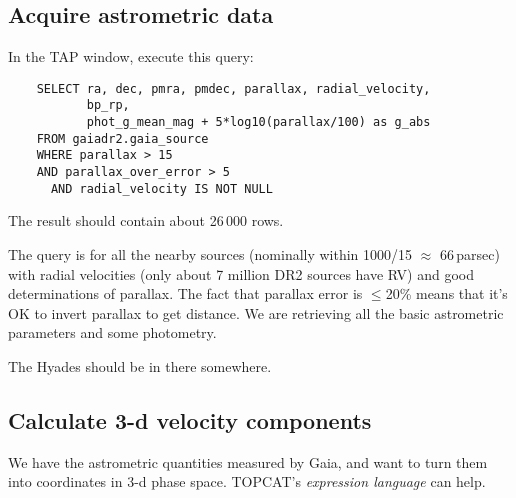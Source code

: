\documentclass{article}
\newcommand{\winfig}[2]
           {\vspace*{-0.5cm}
            \hspace*{0.5cm}\mbox{\vtop{\hbox{\texttt{[image: \#2]}}}}}
\newcommand{\paragap}{\vspace{1.5ex}}
\begin{document}
\begin{minipage}[t]{11cm}
  \subsection{Acquire astrometric data}

  In the TAP window, execute this query:
  \begin{verbatim}
    SELECT ra, dec, pmra, pmdec, parallax, radial_velocity,
           bp_rp,
           phot_g_mean_mag + 5*log10(parallax/100) as g_abs
    FROM gaiadr2.gaia_source
    WHERE parallax > 15
    AND parallax_over_error > 5
      AND radial_velocity IS NOT NULL
  \end{verbatim}
  \vspace*{-2ex}
  The result should contain about 26\,000 rows.
  \paragap

  The query is for all the nearby sources
  (nominally within 1000/15 $\approx$ 66\,parsec)
  with radial velocities (only about 7 million DR2 sources have RV)
  and good determinations of parallax.
  The fact that parallax error is $\leq$20\% means that it's OK
  to invert parallax to get distance.
  We are retrieving all the basic astrometric parameters and some
  photometry.
  \paragap

  The Hyades should be in there somewhere.
\end{minipage}
\begin{minipage}[t]{8cm}
  \winfig{width=8cm}{hy_tapsel.png}

  \vspace*{2cm}

  \winfig{width=8cm}{hy_tapex.png}
\end{minipage}


\newpage

\subsection{Calculate 3-d velocity components}

We have the astrometric quantities measured by Gaia,
and want to turn them into coordinates in 3-d phase space.
TOPCAT's {\em expression language\/} can help.
\vspace*{3ex}
\end{document}
